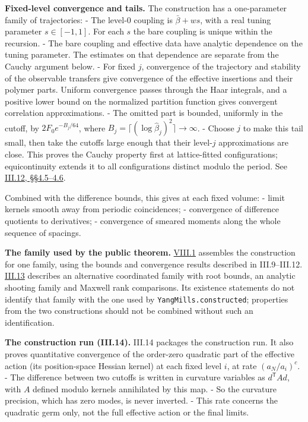 \documentclass[
  letterpaper,
  11pt]{article}
\begin{document}
\textbf{Fixed-level convergence and tails.} The construction has a
one-parameter family of trajectories: - The level-\(0\) coupling is
\(\bar\beta+ws\), with a real tuning parameter \(s\in[-1,1]\). For each
\(s\) the bare coupling is unique within the recursion. - The bare
coupling and effective data have analytic dependence on the tuning
parameter. The estimates on that dependence are separate from the Cauchy
argument below. - For fixed \(j\), convergence of the trajectory and
stability of the observable transfers give convergence of the effective
insertions and their polymer parts. Uniform convergence passes through
the Haar integrals, and a positive lower bound on the normalized
partition function gives convergent correlation approximations. - The
omitted part is bounded, uniformly in the cutoff, by
\(2F_0e^{-B_j/64}\), where
\(B_j=\lceil(\log\hat\beta_j)^2\rceil\to\infty\). - Choose \(j\) to make
this tail small, then take the cutoffs large enough that their
level-\(j\) approximations are close. This proves the Cauchy property
first at lattice-fitted configurations; equicontinuity extends it to all
configurations distinct modulo the period. See
\href{https://github.com/scottnarmstrong/yang-mills-informalization/blob/main/outline/units/III-12.md\#45-convergence-in-the-mesh}{III.12,
§§4.5--4.6}.

Combined with the difference bounds, this gives at each fixed volume: -
limit kernels smooth away from periodic coincidences; - convergence of
difference quotients to derivatives; - convergence of smeared moments
along the whole sequence of spacings.

\textbf{The family used by the public theorem.}
\href{https://github.com/scottnarmstrong/yang-mills-informalization/blob/main/outline/units/VIII-1.md}{VIII.1}
assembles the construction for one family, using the bounds and
convergence results described in III.9--III.12.
\href{https://github.com/scottnarmstrong/yang-mills-informalization/blob/main/outline/units/III-13.md}{III.13}
describes an alternative coordinated family with root bounds, an
analytic shooting family and Maxwell rank comparisons. Its existence
statements do not identify that family with the one used by
\texttt{YangMills.constructed}; properties from the two constructions
should not be combined without such an identification.

\textbf{The construction run (III.14).} III.14 packages the construction
run. It also proves quantitative convergence of the order-zero quadratic
part of the effective action (its position-space Hessian kernel) at each
fixed level \(i\), at rate \((a_N/a_i)^c\). - The difference between two
cutoffs is written in curvature variables as \(d^{\mathsf T}Ad\), with
\(A\) defined modulo kernels annihilated by this map. - So the curvature
precision, which has zero modes, is never inverted. - This rate concerns
the quadratic germ only, not the full effective action or the final
limits.
\end{document}
